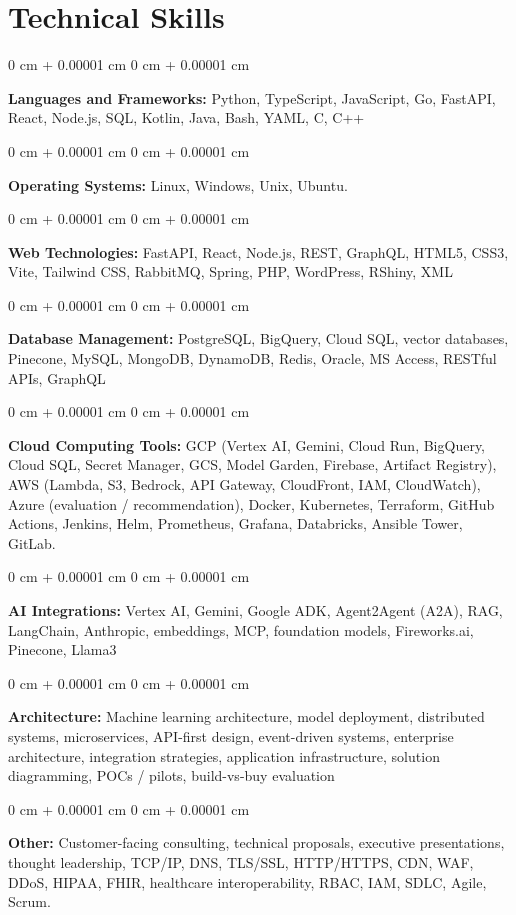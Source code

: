 \documentclass[10pt, letterpaper]{article}
\newenvironment{onecolentry}{
    \begin{adjustwidth}{
        0 cm + 0.00001 cm
    }{
        0 cm + 0.00001 cm
    }
}{
    \end{adjustwidth}
} %
\begin{document}
    \section{Technical Skills}
    \vspace{2 pt }
    \begin{onecolentry}
    \textbf{Languages and Frameworks:} Python, TypeScript, JavaScript, Go, FastAPI, React, Node.js, SQL, Kotlin, Java, Bash, YAML, C, C++
    \end{onecolentry}
    \begin{onecolentry}
        \textbf{Operating Systems:} Linux, Windows, Unix, Ubuntu.
    \end{onecolentry}
    \begin{onecolentry}
         \textbf{Web Technologies:} FastAPI, React, Node.js, REST, GraphQL, HTML5, CSS3, Vite, Tailwind CSS, RabbitMQ, Spring, PHP, WordPress, RShiny, XML
    \end{onecolentry}
    \begin{onecolentry}
        \textbf{Database Management:} PostgreSQL, BigQuery, Cloud SQL, vector databases, Pinecone, MySQL, MongoDB, DynamoDB, Redis, Oracle, MS Access, RESTful APIs, GraphQL
    \end{onecolentry}
    \begin{onecolentry}
        \textbf{Cloud Computing Tools:}
GCP (Vertex AI, Gemini, Cloud Run, BigQuery, Cloud SQL, Secret Manager, GCS, Model Garden, Firebase, Artifact Registry), AWS (Lambda, S3, Bedrock, API Gateway, CloudFront, IAM, CloudWatch), Azure (evaluation / recommendation), Docker, Kubernetes, Terraform, GitHub Actions, Jenkins, Helm, Prometheus, Grafana, Databricks, Ansible Tower, GitLab.
    \end{onecolentry}
    \begin{onecolentry}
         \textbf{AI Integrations:} Vertex AI, Gemini, Google ADK, Agent2Agent (A2A), RAG, LangChain, Anthropic, embeddings, MCP, foundation models, Fireworks.ai, Pinecone, Llama3
    \end{onecolentry}
    \begin{onecolentry}
        \textbf{Architecture:} Machine learning architecture, model deployment, distributed systems, microservices, API-first design, event-driven systems, enterprise architecture, integration strategies, application infrastructure, solution diagramming, POCs / pilots, build-vs-buy evaluation
    \end{onecolentry}
        \begin{onecolentry}
     \textbf{Other:} Customer-facing consulting, technical proposals, executive presentations, thought leadership, TCP/IP, DNS, TLS/SSL, HTTP/HTTPS, CDN, WAF, DDoS, HIPAA, FHIR, healthcare interoperability, RBAC, IAM, SDLC, Agile, Scrum.
    \end{onecolentry}
\end{document}
